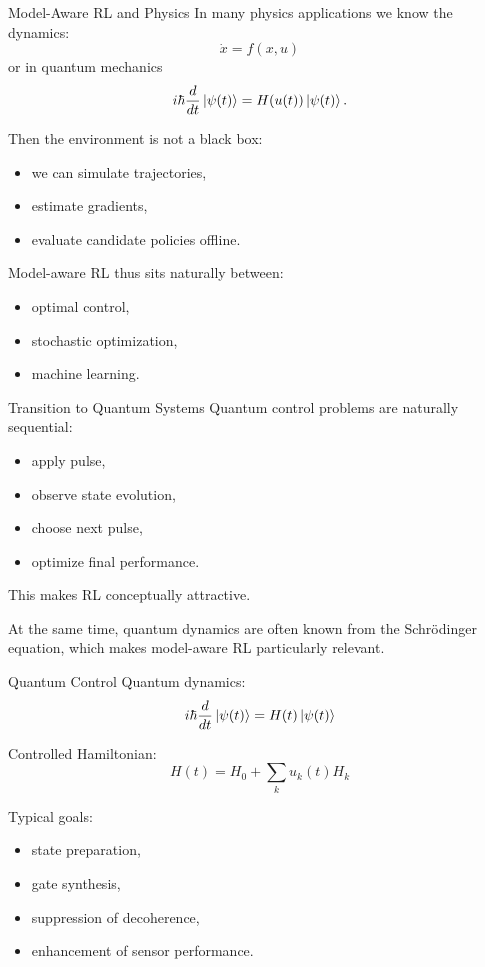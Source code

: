 \documentclass[aspectratio=169]{beamer}
\begin{document}
\begin{frame}{Model-Aware RL and Physics}
  In many physics applications we know the dynamics:
  \[
  \dot x = f(x,u)
  \]
  or in quantum mechanics
  \[
  i\hbar \frac{d}{dt}\ket{\psi(t)}=H(u(t))\ket{\psi(t)}.
  \]

  Then the environment is not a black box:
  \begin{itemize}
  \item we can simulate trajectories,
  \item estimate gradients,
  \item evaluate candidate policies offline.
  \end{itemize}

  Model-aware RL thus sits naturally between:
  \begin{itemize}
  \item optimal control,
  \item stochastic optimization,
  \item machine learning.
  \end{itemize}
\end{frame}




\begin{frame}{Transition to Quantum Systems}
  Quantum control problems are naturally sequential:
  \begin{itemize}
  \item apply pulse,
  \item observe state evolution,
  \item choose next pulse,
  \item optimize final performance.
  \end{itemize}

  This makes RL conceptually attractive.

  At the same time, quantum dynamics are often known from the Schr\"odinger equation, which makes model-aware RL particularly relevant.
\end{frame}

\begin{frame}{Quantum Control}
  Quantum dynamics:
  \[
  i\hbar \frac{d}{dt}\ket{\psi(t)} = H(t)\ket{\psi(t)}
  \]

  Controlled Hamiltonian:
  \[
  H(t)=H_0+\sum_k u_k(t)H_k
  \]

  Typical goals:
  \begin{itemize}
  \item state preparation,
  \item gate synthesis,
  \item suppression of decoherence,
  \item enhancement of sensor performance.
  \end{itemize}
\end{frame}
\end{document}
